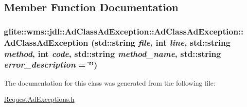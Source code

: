 \subsection{Member Function Documentation}
\hypertarget{classglite_1_1wms_1_1jdl_1_1AdClassAdException_a0}{
\subsubsection[AdClassAdException::AdClassAdException]{\setlength{\rightskip}{0pt plus 5cm}glite::wms::jdl::Ad\-Class\-Ad\-Exception::Ad\-Class\-Ad\-Exception::Ad\-Class\-Ad\-Exception (std::string {\em file}, int {\em line}, std::string {\em method}, int {\em code}, std::string {\em method\_\-name}, std::string {\em error\_\-description} = \char`\"{}\char`\"{})}}
\label{classglite_1_1wms_1_1jdl_1_1AdClassAdException_a0}




The documentation for this class was generated from the following file:\begin{CompactItemize}
\item 
\hyperlink{RequestAdExceptions_8h}{Request\-Ad\-Exceptions.h}\end{CompactItemize}
